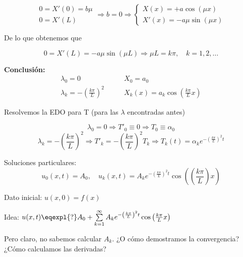 \begin{example}
\begin{itemize}
			 	\[
			 		\begin{array}{l}
			 		0 = X'(0) = b \mu \\
			 		0 = X'(L)
			 		\end{array} \Rightarrow b = 0 \Rightarrow \left\{ \begin{array}{l}
			 			X(x) = + a \cos (\mu x ) \\
			 			X'(x) = -a \mu \sin (\mu x)
			 		\end{array} \right.
			 	\]

			 	De lo que obtenemos que

			 	\[0 = X'(L) = -a \mu \sin(\mu L) \Rightarrow \mu L = k \pi , \quad k = 1,2,…\]



		\end{itemize}

		{\bf Conclusión:}
				\begin{align*}
					\lambda_0 = 0\quad & \quad X_0 = a_0 \\
					\lambda_k = - \left(\frac{k\pi}{L}\right)^2\quad & \quad X_k(x) = a_k \cos \left(\frac{k \pi}{L}x\right)
				\end{align*}

			 	Resolvemos la EDO para T (para las $\lambda$ encontradas antes)

			 	\[\lambda_0 = 0 \Rightarrow T'_0 \equiv 0 \Rightarrow T_0 \equiv \alpha_0\]
			 	\[\lambda_k = - \left(\frac{k\pi}{L}\right)^2 \Rightarrow T'_k = -\left(\frac{k\pi}{L}\right)^2 T_k \Rightarrow T_k (t) = \alpha_k e^{-\left(\frac{k\pi}{L}\right)^2 t} \]

			 	Soluciones particulares:
			 	\[u_0(x,t) = A_0, \quad u_k (x,t) = A_k e^{-\left(\frac{k \pi}{L} \right)^2 t} \cos \left( \left( \frac{k \pi}{L}\right) x \right) \]

			 	Dato inicial: $u(x,0) = f(x)$

			 	Idea: $u(x,t) \eqexpl{?} A_0 + \sum\limits_{k=1}^{\infty} A_k e^{- \left( \frac{k \pi}{L} \right)^2 t}  \cos \left( \frac{k \pi}{L} x \right)$

			 	Pero claro, no sabemos calcular $A_k$. ¿O cómo demostramos la convergencia? ¿Cómo calculamos las derivadas?


		\end{example}

